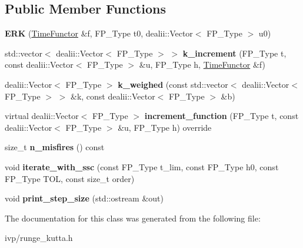 \subsection*{Public Member Functions}
\begin{DoxyCompactItemize}
\item 
\mbox{\label{classERK_a2e9bccb7699bc97bd3800c25d86ee814}} 
{\bfseries E\+RK} (\hyperlink{classTimeFunctor}{Time\+Functor} \&f, F\+P\+\_\+\+Type t0, dealii\+::\+Vector$<$ F\+P\+\_\+\+Type $>$ u0)
\item 
\mbox{\label{classERK_a6d4e2e59dc9c8fc8f3fe67522485ca3d}} 
std\+::vector$<$ dealii\+::\+Vector$<$ F\+P\+\_\+\+Type $>$ $>$ {\bfseries k\+\_\+increment} (F\+P\+\_\+\+Type t, const dealii\+::\+Vector$<$ F\+P\+\_\+\+Type $>$ \&u, F\+P\+\_\+\+Type h, \hyperlink{classTimeFunctor}{Time\+Functor} \&f)
\item 
\mbox{\label{classERK_a43fe4b23617b7d013f64b10bad3782e7}} 
dealii\+::\+Vector$<$ F\+P\+\_\+\+Type $>$ {\bfseries k\+\_\+weighed} (const std\+::vector$<$ dealii\+::\+Vector$<$ F\+P\+\_\+\+Type $>$ $>$ \&k, const dealii\+::\+Vector$<$ F\+P\+\_\+\+Type $>$ \&b)
\item 
\mbox{\label{classERK_ad6b4a1f225469f47dad5b17bb6791f30}} 
virtual dealii\+::\+Vector$<$ F\+P\+\_\+\+Type $>$ {\bfseries increment\+\_\+function} (F\+P\+\_\+\+Type t, const dealii\+::\+Vector$<$ F\+P\+\_\+\+Type $>$ \&u, F\+P\+\_\+\+Type h) override
\item 
\mbox{\label{classERK_ae3f71b3f5364ffcab63a715d95adb911}} 
size\+\_\+t {\bfseries n\+\_\+misfires} () const
\item 
\mbox{\label{classERK_a1c910a06f9210a07061864f67fc31b3e}} 
void {\bfseries iterate\+\_\+with\+\_\+ssc} (const F\+P\+\_\+\+Type t\+\_\+lim, const F\+P\+\_\+\+Type h0, const F\+P\+\_\+\+Type T\+OL, const size\+\_\+t order)
\item 
\mbox{\label{classERK_a6057b70fbd97bbe2e5b2d0233aef46a4}} 
void {\bfseries print\+\_\+step\+\_\+size} (std\+::ostream \&out)
\end{DoxyCompactItemize}


The documentation for this class was generated from the following file\+:\begin{DoxyCompactItemize}
\item 
ivp/runge\+\_\+kutta.\+h\end{DoxyCompactItemize}
